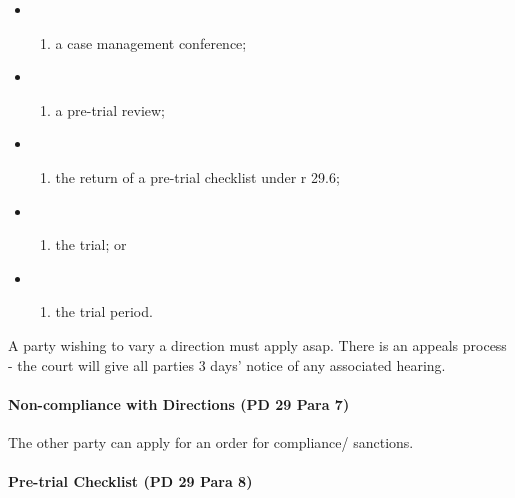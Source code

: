 \documentclass[
]{article}
\providecommand{\tightlist}{%
  \setlength{\itemsep}{0pt}\setlength{\parskip}{0pt}}
\begin{document}
\begin{itemize}
\item
  \begin{enumerate}
  \def\labelenumi{(\alph{enumi})}
  \tightlist
  \item
    a case management conference;
  \end{enumerate}
\item
  \begin{enumerate}
  \def\labelenumi{(\alph{enumi})}
  \setcounter{enumi}{1}
  \tightlist
  \item
    a pre-trial review;
  \end{enumerate}
\item
  \begin{enumerate}
  \def\labelenumi{(\alph{enumi})}
  \setcounter{enumi}{2}
  \tightlist
  \item
    the return of a pre-trial checklist under r 29.6;
  \end{enumerate}
\item
  \begin{enumerate}
  \def\labelenumi{(\alph{enumi})}
  \setcounter{enumi}{3}
  \tightlist
  \item
    the trial; or
  \end{enumerate}
\item
  \begin{enumerate}
  \def\labelenumi{(\alph{enumi})}
  \setcounter{enumi}{4}
  \tightlist
  \item
    the trial period.
  \end{enumerate}
\end{itemize}

A party wishing to vary a direction must apply asap. There is an appeals
process - the court will give all parties 3 days' notice of any
associated hearing.

\hypertarget{non-compliance-with-directions-pd-29-para-7}{%
\paragraph{Non-compliance with Directions (PD 29 Para
7)}\label{non-compliance-with-directions-pd-29-para-7}}

The other party can apply for an order for compliance/ sanctions.

\hypertarget{pre-trial-checklist-pd-29-para-8}{%
\paragraph{Pre-trial Checklist (PD 29 Para
8)}\label{pre-trial-checklist-pd-29-para-8}}
\end{document}
